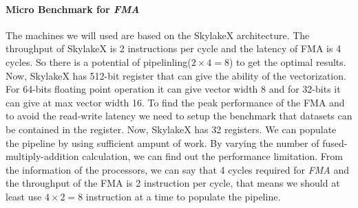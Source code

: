 \documentclass[sigconf,review,anonymous]{acmart}
\begin{document}
\paragraph{Micro Benchmark for \textit{FMA}}
The machines we will used are based on the SkylakeX architecture. The throughput of SkylakeX is 2 instructions per cycle and the latency of FMA is 4 cycles. So there is a potential 
of pipelinling($2\times 4 = 8$) to get the optimal results. Now, SkylakeX 
has 512-bit register that can give the ability of the vectorization. For 64-bits floating point operation it can give vector 
width 8 and for 32-bits it can give at max vector width 16. To find the peak performance of the FMA and to avoid the 
read-write latency we need to setup the benchmark that datasets can be contained in the register. Now, SkylakeX has 32 
registers. We can populate the pipeline by using sufficient ampunt of work. By varying the 
number of fused-multiply-addition calculation, we can find out the performance limitation. From the information of the 
processors, we can say that 4 cycles required for \textit{FMA} and the throughput of the FMA is 2 instruction per cycle, that means 
we should at least use $4\times 2=8$ instruction at a time to populate the pipeline.
\end{document}
